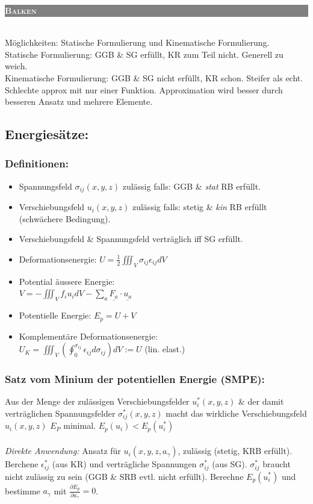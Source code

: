 \documentclass[a4paper,10pt]{article}
\newcommand{\uone}[2]{\colorbox{gray}{\textcolor{white}{\parbox{\linewidth-2.4}{\scshape{\medium\textbf{#1}} }}}\\}
\begin{document}
\begin{multicols}{3}
\uone{Balken}
    2 Möglichkeiten: Statische Formulierung und Kinematische Formulierung.\\
    Statische Formulierung: GGB \& SG erfüllt, KR zum Teil nicht. Generell zu weich.\\
    Kinematische Formulierung: GGB \& SG nicht erfüllt, KR schon. Steifer als echt. Schlechte approx mit nur einer Funktion. Approximation wird besser durch besseren Ansatz und mehrere Elemente.
    \subsection{Energiesätze:}
        \subsubsection{Definitionen:}
            \begin{itemize}
                \item Spannungsfeld $\sigma_{ij}(x,y,z)$ zulässig falls: GGB \& \textit{stat} RB erfüllt.
                \item Verschiebungsfeld $u_i(x,y,z)$ zulässig falls: stetig \& \textit{kin} RB erfüllt (schwächere Bedingung).
                \item Verschiebungsfeld \& Spannungsfeld verträglich iff SG erfüllt.
                \item Deformationsenergie: $\displaystyle U=\frac{1}{2}\iiint_V \sigma_{ij}\epsilon_{ij}dV$
                \item Potential äussere Energie:\\
                $\displaystyle V=-\iiint_V f_iu_idV-\sum_{a}\underline{F_a}\cdot\underline{u_a}$ 
                \item Potentielle Energie: $E_p=U+V$
                \item Komplementäre Deformationsenergie:\\ $U_K=\iiint_V(\oint_0^{\sigma_{ij}}\epsilon_{ij}d\sigma_{ij})dV := U$  (lin. elast.)
            \end{itemize}
        \subsubsection{Satz vom Minium der potentiellen Energie (SMPE):}
            Aus der Menge der zulässigen Verschiebungsfelder $u_i^*(x,y,z)$ \& der damit verträglichen Spannungsfelder $\sigma_{ij}^*(x,y,z)$ macht das wirkliche Verschiebungsfeld $u_i(x,y,z)$ $E_P$ minimal. $E_p(u_i) < E_p(u_i^*)$\\\\
            \textit{Direkte Anwendung:} Ansatz für $u_i(x,y,z,a_\gamma)$, zulässig (stetig, KRB erfüllt). Berchene $\epsilon_{ij}^*$ (aus KR) und verträgliche Spannungen $\sigma_{ij}^*$ (aus SG). $\sigma_{ij}^*$ braucht nicht zulässig zu sein (GGB \& SRB evtl. nicht erfüllt). Berechne $E_p(u_i^*)$ und bestimme $a_\gamma$ mit $\frac{\partial E_p}{\partial a_\gamma}=0$.

\end{multicols}
\end{document}
